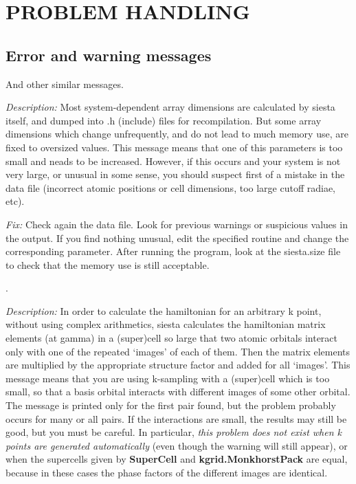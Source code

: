 \section{PROBLEM HANDLING}

\subsection{Error and warning messages}

\begin{description}
\itemsep 10pt
\parsep 0pt

\item[{\tt chkdim: ERROR: In {\it routine} dimension {\it parameter} =
{\it value}. It must be  ...}]

And other similar messages.

{\it Description:}
Most system-dependent array dimensions are calculated by siesta itself,
and dumped into .h (include) files for recompilation.
But some array dimensions which change unfrequently, and do not lead to
much memory use, are fixed to oversized values. This message means that
one of this parameters is too small and neads to be increased.
However, if this occurs and your system is not very large, or unusual in
some sense, you should suspect first of a mistake in the data file (incorrect
atomic positions or cell dimensions, too large cutoff radiae, etc).

{\it Fix:}
Check again the data file. 
Look for previous warnings or suspicious values in the output.
If you find nothing unusual, edit the specified routine and change the 
corresponding parameter.
After running the program, look at the siesta.size file to check that
the memory use is still acceptable.

\item[{\tt xijorb: WARNING: orbital pair ... is multiply connected}].

{\it Description:}
In order to calculate the hamiltonian for an arbitrary k point, 
without using complex arithmetics, siesta calculates the hamiltonian 
matrix elements (at gamma) in a (super)cell so large that two atomic
orbitals interact only with one of the repeated `images' of each of
them. Then the matrix elements are multiplied by the appropriate
structure factor and added for all `images'.
This message means that you are using k-sampling with a (super)cell
which is too small, so that a basis orbital interacts with different
images of some other orbital. The message is printed only for the
first pair found, but the problem probably occurs for many or all pairs.
If the interactions are small, the results may still be good, but you
must be careful.
In particular, {\it this problem does not exist when k points are 
generated automatically} (even though
the warning will still appear), or when the supercells given by
{\bf SuperCell} and {\bf kgrid.MonkhorstPack} are equal, 
because in these cases the phase factors
of the different images are identical.


\end{description}
